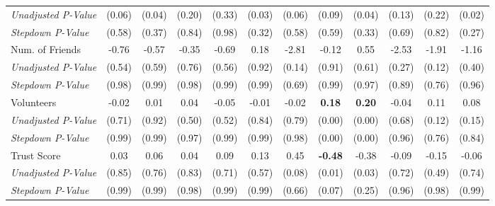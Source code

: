 \begin{tabular}{l c c c c c c c c c c c}
\quad \textit{Unadjusted P-Value} & (0.06) & (0.04) & (0.20) & (0.33) & (0.03) & (0.06) & (0.09) & (0.04) & (0.13) & (0.22) & (0.02) \\
\quad \textit{Stepdown P-Value} & (0.58) & (0.37) & (0.84) & (0.98) & (0.32) & (0.58) & (0.59) & (0.33) & (0.69) & (0.82) & (0.27) \\
Num. of Friends & -0.76 & -0.57 & -0.35 & -0.69 & 0.18 & -2.81 & -0.12 & 0.55 & -2.53 & -1.91 & -1.16 \\
\quad \textit{Unadjusted P-Value} & (0.54) & (0.59) & (0.76) & (0.56) & (0.92) & (0.14) & (0.91) & (0.61) & (0.27) & (0.12) & (0.40) \\
\quad \textit{Stepdown P-Value} & (0.98) & (0.99) & (0.98) & (0.99) & (0.99) & (0.69) & (0.99) & (0.97) & (0.89) & (0.76) & (0.96) \\
Volunteers & -0.02 & 0.01 & 0.04 & -0.05 & -0.01 & -0.02 & \textbf{ 0.18 } & \textbf{ 0.20 } & -0.04 & 0.11 & 0.08 \\
\quad \textit{Unadjusted P-Value} & (0.71) & (0.92) & (0.50) & (0.52) & (0.84) & (0.79) & (0.00) & (0.00) & (0.68) & (0.12) & (0.15) \\
\quad \textit{Stepdown P-Value} & (0.99) & (0.99) & (0.97) & (0.99) & (0.99) & (0.98) & (0.00) & (0.00) & (0.96) & (0.76) & (0.84) \\
Trust Score & 0.03 & 0.06 & 0.04 & 0.09 & 0.13 & 0.45 & \textbf{ -0.48 } & -0.38 & -0.09 & -0.15 & -0.06 \\
\quad \textit{Unadjusted P-Value} & (0.85) & (0.76) & (0.83) & (0.71) & (0.57) & (0.08) & (0.01) & (0.03) & (0.72) & (0.49) & (0.74) \\
\quad \textit{Stepdown P-Value} & (0.99) & (0.99) & (0.98) & (0.99) & (0.99) & (0.66) & (0.07) & (0.25) & (0.96) & (0.98) & (0.99) \\
\bottomrule
\end{tabular}
